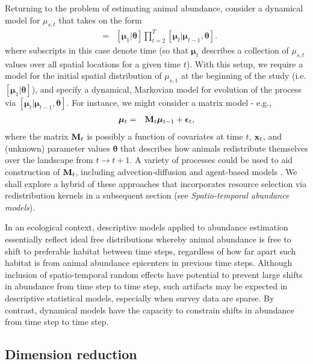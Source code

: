 \documentclass[12pt,english]{article}
\begin{document}
\begin{spacing}{1.9}
Returning to the problem of estimating animal abundance, consider a dynamical model for $\mu_{s,t}$ that takes on the form
\begin{eqnarray}
  [\boldsymbol{\mu}|\boldsymbol{\theta}] & = & [\boldsymbol{\mu}_1 | \boldsymbol{\theta}] \prod_{t=2}^T [\boldsymbol{\mu}_t | \boldsymbol{\mu}_{t-1},\boldsymbol{\theta}].
  \label{eq:mu}
\end{eqnarray}
where subscripts in this case denote time (so that $\boldsymbol{\mu}_t$ describes a collection of $\mu_{s,t}$ values over all spatial locations for a given time $t$).  With this setup, we require a model for the initial spatial distribution of $\mu_{s,1}$ at the beginning of the study (i.e. $[\boldsymbol{\mu}_1 | \boldsymbol{\theta}]$), and
specify a dynamical, Markovian model for evolution of the process via $[\boldsymbol{\mu}_t | \boldsymbol{\mu}_{t-1},\boldsymbol{\theta}]$.  For instance, we might consider a matrix model - e.g.,
\begin{eqnarray}
\boldsymbol{\mu}_t  & = & {\bf M}_t \boldsymbol{\mu}_{t-1} + \boldsymbol{\epsilon}_t,
 \label{eq:matrix-mod}
\end{eqnarray}
where the matrix ${\bf M}_t$ is possibly a function of covariates at time $t$, ${\bf x}_t$, and (unknown) parameter values $\boldsymbol{\theta}$ that describes how animals
redistribute themselves over the landscape from $t \rightarrow t+1$.  A variety of processes could be used to aid construction of ${\bf M}_t$, including advection-diffusion \citep{Wikle2003} and agent-based models \citep{HootenWikle2010}.  We shall explore a hybrid of these approaches that incorporates resource selection via redistribution kernels in a subsequent section (see {\it Spatio-temporal abundance models}).

In an ecological context, descriptive models applied to abundance estimation essentially reflect ideal free distributions \citep{FretwellLucas1970} whereby animal abundance is free to shift to preferable habitat between time steps, regardless of how far apart such habitat is from animal abundance epicenters in previous time steps.  Although inclusion of spatio-temporal random effects have potential to prevent large shifts in abundance from time step to time step, such artifacts may be expected in descriptive statistical models, especially when survey data are sparse.  By contrast, dynamical models have the capacity to constrain shifts in abundance from time step to time step.

\subsection{Dimension reduction}


\end{spacing}
\end{document}
